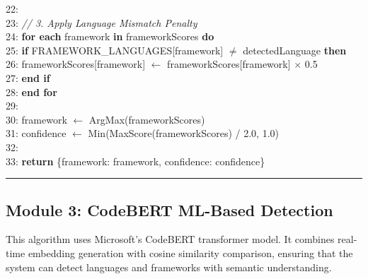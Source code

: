 22:\\
23: \textit{// 3. Apply Language Mismatch Penalty}\\
24: \textbf{for each} framework \textbf{in} frameworkScores \textbf{do}\\
25: \hspace{0.5cm}\textbf{if} FRAMEWORK\_LANGUAGES[framework] $\neq$ detectedLanguage \textbf{then}\\
26: \hspace{1cm}frameworkScores[framework] $\leftarrow$ frameworkScores[framework] $\times$ 0.5\\
27: \hspace{0.5cm}\textbf{end if}\\
28: \textbf{end for}\\
29:\\
30: framework $\leftarrow$ ArgMax(frameworkScores)\\
31: confidence $\leftarrow$ Min(MaxScore(frameworkScores) / 2.0, 1.0)\\
32:\\
33: \textbf{return} \{framework: framework, confidence: confidence\}\\
\noindent\rule{\textwidth}{0.4pt}

\subsection{Module 3: CodeBERT ML-Based Detection}

This algorithm uses Microsoft's CodeBERT transformer model. It combines real-time embedding generation with cosine similarity comparison, ensuring that the system can detect languages and frameworks with semantic understanding.

